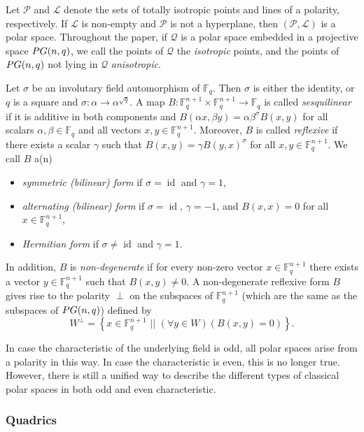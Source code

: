 \documentclass[a4paper]{article}
\theoremstyle{definition}
\newcommand{\FF}{\mathbb F}
\newcommand{\sett}[2]{ \left\{ #1 \, \, || \, \, #2 \right \} }
\newcommand{\pg}{\textnormal{PG}}
\newcommand{\pp}{\mathcal P}
\newcommand{\ml}{\mathcal L}
\newcommand{\mq}{\mathcal Q}
\DeclareMathOperator{\id}{id}
\newcommand{\sam}[1]{\textcolor{purple}{#1}}
\begin{document}
Let $\pp$ and $\ml$ denote the sets of totally isotropic points and lines of a polarity, respectively.
If $\ml$ is non-empty and $\pp$ is not a hyperplane, then $(\pp,\ml)$ is a polar space.
Throughout the paper, if $\mq$ is a polar space embedded in a projective space $\pg(n,q)$, we call the points of $\mq$ the \emph{isotropic} points, and the points of $\pg(n,q)$ not lying in $\mq$ \emph{anisotropic}.

Let $\sigma$ be an involutary field automorphism of $\FF_q$.
Then $\sigma$ is either the identity, or $q$ is a square and $\sigma: \alpha \to \alpha^{\sqrt q}$.
A map $B: \FF_q^{n+1} \times \FF_q^{n+1} \to \FF_q$ is called \emph{sesquilinear} if it is additive in both components and 
$B(\alpha x, \beta y) = \alpha \beta^\sigma B(x,y)$ for all scalars $\alpha, \beta \in \FF_q$ and all vectors $x,y \in \FF_q^{n+1}$.
Moreover, $B$ is called \emph{reflexive} if there exists a scalar $\gamma$ such that $B(x,y) = \gamma B(y,x)^\sigma$ for all $x,y \in \FF_q^{n+1}$.
We call $B$ a(n)
\begin{itemize}
 \item \emph{symmetric (bilinear) form} if $\sigma = \id$ and $\gamma = 1$,
 \item \emph{alternating (bilinear) form} if $\sigma = \id$, $\gamma=-1$, and $B(x,x) = 0$ for all $x \in \FF_q^{n+1}$,
 \item \emph{Hermitian form} if $\sigma \neq \id$ and $\gamma=1$.
\end{itemize}
In addition, $B$ is \emph{non-degenerate} if for every non-zero vector $x \in \FF_q^{n+1}$ there exists a vector $y \in \FF_q^{n+1}$ such that $B(x,y) \neq 0$.
A non-degenerate reflexive form $B$ gives rise to the polarity $\perp$ on the subspaces of $\FF_q^{n+1}$ (which are the same as the subspaces of $\pg(n,q)$) defined by
\[
 W^\perp = \sett{ x \in \FF_q^{n+1} }{ \left(\forall y \in W \right) (B(x,y) = 0 ) }.
\]

In case the characteristic of the underlying field is odd, all polar spaces arise from a polarity in this way.
In case the characteristic is even, this is no longer true.
However, there is still a unified way to describe the different types of classical polar spaces in both odd and even characteristic.


\subsubsection{Quadrics}
\end{document}

